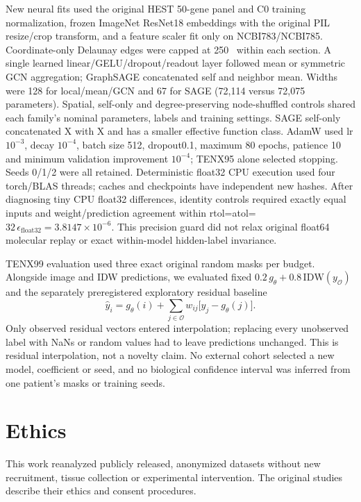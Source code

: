 New neural fits used the original HEST 50-gene panel and C0 training normalization, frozen ImageNet ResNet18 embeddings with the original PIL resize/crop transform, and a feature scaler fit only on NCBI783/NCBI785. Coordinate-only Delaunay edges were capped at 250~\um{} within each section. A single learned linear/GELU/dropout/readout layer followed mean or symmetric GCN aggregation; GraphSAGE concatenated self and neighbor mean. Widths were 128 for local/mean/GCN and 67 for SAGE (72,114 versus 72,075 parameters). Spatial, self-only and degree-preserving node-shuffled controls shared each family's nominal parameters, labels and training settings. SAGE self-only concatenated X with X and has a smaller effective function class. AdamW used lr $10^{-3}$, decay $10^{-4}$, batch size 512, dropout0.1, maximum 80 epochs, patience 10 and minimum validation improvement $10^{-4}$; TENX95 alone selected stopping. Seeds 0/1/2 were all retained. Deterministic float32 CPU execution used four torch/BLAS threads; caches and checkpoints have independent new hashes. After diagnosing tiny CPU float32 differences, identity controls required exactly equal inputs and weight/prediction agreement within rtol=atol=$32\,\epsilon_{\mathrm{float32}}=3.8147\times10^{-6}$. This precision guard did not relax original float64 molecular replay or exact within-model hidden-label invariance.

TENX99 evaluation used three exact original random masks per budget. Alongside image and IDW predictions, we evaluated fixed $0.2\,g_\theta+0.8\,\mathrm{IDW}(y_{\mathcal O})$ and the separately preregistered exploratory residual baseline
\[
\widehat y_i=g_\theta(i)+\sum_{j\in\mathcal O}w_{ij}\big[y_j-g_\theta(j)\big].
\]
Only observed residual vectors entered interpolation; replacing every unobserved label with NaNs or random values had to leave predictions unchanged. This is residual interpolation, not a novelty claim. No external cohort selected a new model, coefficient or seed, and no biological confidence interval was inferred from one patient's masks or training seeds.

\section{Ethics}
This work reanalyzed publicly released, anonymized datasets without new recruitment, tissue collection or experimental intervention. The original studies describe their ethics and consent procedures\cite{andersson2021,wu2021,bassiouni2023}.
